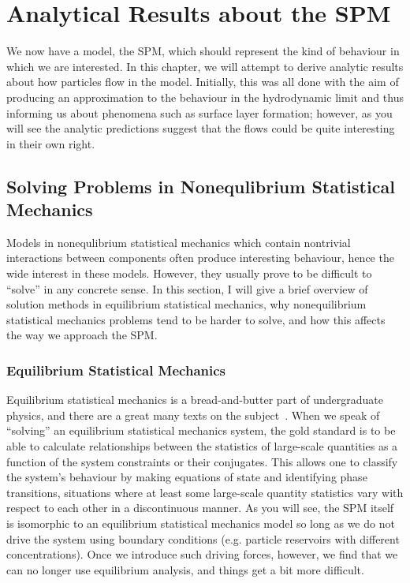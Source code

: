 \chapter{Analytical Results about the SPM} \label{sec:analChap}

We now have a model, the SPM, which should represent the kind of behaviour in which we are interested.
In this chapter, we will attempt to derive analytic results about how particles flow in the model. Initially,
this was all done with the aim of
producing an approximation to the behaviour in the hydrodynamic limit and thus informing us about phenomena such as surface layer formation; however, as you will see the analytic
predictions suggest that the flows could be quite interesting in their own
right.

\section{Solving Problems in Nonequlibrium Statistical Mechanics}
Models in nonequlibrium statistical mechanics which contain nontrivial interactions between components often produce interesting behaviour, hence the wide interest in these models. However, they usually prove to be difficult to ``solve'' in any
concrete sense. In this section, I will give a brief overview of solution methods in equilibrium statistical mechanics, why nonequilibrium statistical mechanics problems tend to be harder to solve, and how this affects the way we approach
the SPM.


\subsection{Equilibrium Statistical Mechanics}
Equilibrium statistical mechanics is a bread-and-butter part of undergraduate physics, and there are a great many texts on the subject~\cite{landauLifshitzStatmech, reif2009}.
When we speak of ``solving'' an equilibrium statistical mechanics system, the gold standard is to be able to calculate relationships between the statistics of large-scale quantities as a function of the system constraints or their conjugates.
This allows one to classify the system's behaviour by making equations of state  and identifying phase transitions, situations where at least some large-scale quantity statistics vary with respect to each other in a discontinuous manner.
As you will see, the SPM itself is isomorphic to an equilibrium statistical mechanics model so long as we do not drive the system using boundary conditions (e.g. particle reservoirs with different concentrations). Once we introduce such driving forces, however, we find that we can no longer use
equilibrium analysis, and things get a bit more difficult.
